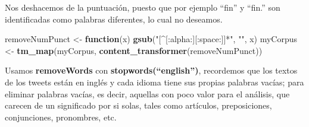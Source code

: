 \documentclass[]{article}
\newenvironment{Shaded}{\begin{snugshade}}{\end{snugshade}}
\newcommand{\ControlFlowTok}[1]{\textcolor[rgb]{0.13,0.29,0.53}{\textbf{#1}}}
\newcommand{\KeywordTok}[1]{\textcolor[rgb]{0.13,0.29,0.53}{\textbf{#1}}}
\newcommand{\NormalTok}[1]{#1}
\newcommand{\StringTok}[1]{\textcolor[rgb]{0.31,0.60,0.02}{#1}}
\begin{document}
Nos deshacemos de la puntuación, puesto que por ejemplo ``fin'' y
``fin.'' son identificadas como palabras diferentes, lo cual no
deseamos.

\begin{Shaded}
\begin{Highlighting}[]
\NormalTok{removeNumPunct <-}\StringTok{ }\ControlFlowTok{function}\NormalTok{(x) }\KeywordTok{gsub}\NormalTok{(}\StringTok{"[^[:alpha:][:space:]]*"}\NormalTok{, }\StringTok{""}\NormalTok{, x)   }
\NormalTok{myCorpus <-}\StringTok{ }\KeywordTok{tm_map}\NormalTok{(myCorpus, }\KeywordTok{content_transformer}\NormalTok{(removeNumPunct))}
\end{Highlighting}
\end{Shaded}

Usamos \textbf{removeWords} con \textbf{stopwords(``english'')},
recordemos que los textos de los tweets están en inglés y cada idioma
tiene sus propias palabras vacías; para eliminar palabras vacías, es
decir, aquellas con poco valor para el análisis, que carecen de un
significado por si solas, tales como artículos, preposiciones,
conjunciones, pronombres, etc.
\end{document}

